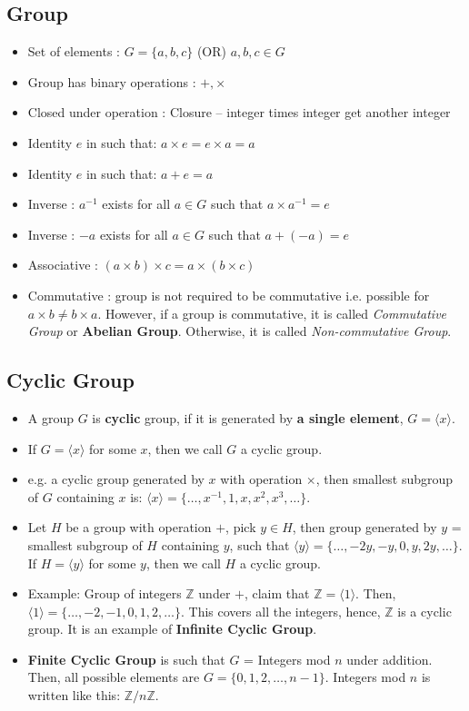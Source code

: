 \documentclass[a4paper]{article}
\newcommand{\Z}{\mathbb{Z}}
\begin{document}
\subsection{Group}

\begin{itemize}
\item Set of elements : $G = \{a,b,c\}$ (OR) $a, b, c \in G$
\item Group has binary operations : $+, \times$
\item Closed under operation : Closure -- integer times integer get another integer
\item Identity $e$ in such that: $a \times e = e \times a = a$
\item Identity $e$ in such that: $a + e = a$
\item Inverse : $a^{-1}$ exists for all $a \in G$ such that $a \times a^{-1} = e$
\item Inverse : $-a$ exists for all $a \in G$ such that $a + (-a) = e$
\item Associative : $(a \times b) \times c = a \times (b \times c)$
\item Commutative : group is not required to be commutative i.e. possible for $a \times b \neq b \times a$. However, if a group is commutative, it is called \textit{Commutative Group} or \textbf{Abelian Group}. Otherwise, it is called \textit{Non-commutative Group}.
\end{itemize}


\subsection{Cyclic Group}

\begin{itemize}
\item A group $G$ is \textbf{cyclic} group, if it is generated by \textbf{a single element}, $G = \langle x \rangle$.
\item If $G = \langle x \rangle$ for some $x$, then we call $G$ a cyclic group.
\item e.g. a cyclic group generated by $x$ with operation $\times$, then smallest subgroup of $G$ containing $x$ is: \quad $\langle x \rangle = \{ \dots , x^{-1}, 1, x, x^2, x^3, \dots \}$.
\item Let $H$ be a group with operation $+$, pick $y \in H$, then group generated by $y$ = smallest subgroup of $H$ containing $y$, such that $\langle y \rangle = \{ \dots , -2y, -y, 0, y, 2y, \dots \}$. If $H = \langle y \rangle$ for some $y$, then we call $H$ a cyclic group.
\item Example: Group of integers $\Z$  under $+$, claim that $\Z = \langle 1 \rangle$. Then, $\langle 1 \rangle = \{ \dots, -2, -1, 0, 1, 2, \dots \}$. This covers all the integers, hence, $\Z$ is a cyclic group. It is an example of \textbf{Infinite Cyclic Group}.
\item \textbf{Finite Cyclic Group} is such that $G$ = Integers mod $n$ under addition. Then, all possible elements are $G = \{0, 1, 2, \dots, n-1\}$. Integers mod $n$ is written like this: $\Z /n \Z$.
\end{itemize}
\end{document}
